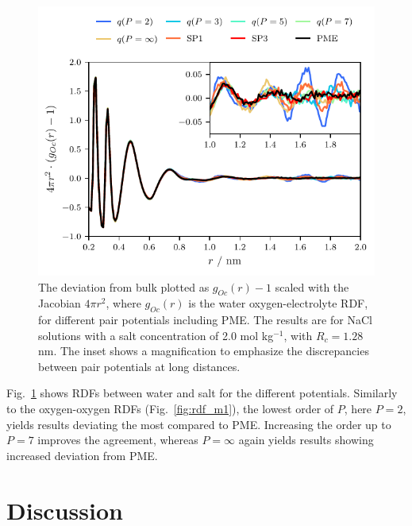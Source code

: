 \documentclass[
journal=jctcce,
manuscript=letter]{achemso}
\begin{document}
\begin{figure}[!ht]
    \centering
    \includegraphics[width=0.9\columnwidth]{g-1_error.pdf}
    \caption{The deviation from bulk plotted as $g_{Oc}(r)-1$ scaled with the Jacobian $4\pi r^2$, where $g_{Oc}(r)$ is the water oxygen-electrolyte RDF, for different pair potentials including PME. The results are for NaCl solutions with a salt concentration of 2.0 mol kg$^{-1}$, with $R_c=1.28$ nm. The inset shows a magnification to emphasize the discrepancies between pair potentials at long distances.}
    \label{fig:logOfErrSalt}
\end{figure}

Fig.~\ref{fig:logOfErrSalt} shows RDFs between water and salt for the different potentials. Similarly to the oxygen-oxygen RDFs (Fig.~\ref{fig:rdf_m1}), the lowest order of $P$, here $P=2$, yields results deviating the most compared to PME. Increasing the order up to $P=7$ improves the agreement, whereas $P=\infty$ again yields results showing increased deviation from PME.

\section{Discussion}
\end{document}

